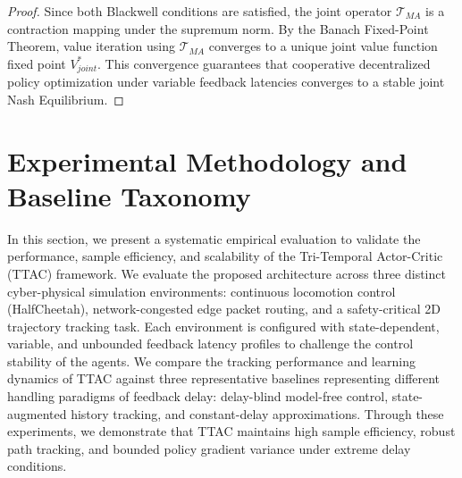 \documentclass[manuscript, screen, review]{jair}
\begin{document}
\begin{proof}
Since both Blackwell conditions are satisfied, the joint operator $\mathcal{T}_{MA}$ is a contraction mapping under the supremum norm. By the Banach Fixed-Point Theorem, value iteration using $\mathcal{T}_{MA}$ converges to a unique joint value function fixed point $V_{joint}^*$. This convergence guarantees that cooperative decentralized policy optimization under variable feedback latencies converges to a stable joint Nash Equilibrium.
\end{proof}

\section{Experimental Methodology and Baseline Taxonomy}
In this section, we present a systematic empirical evaluation to validate the performance, sample efficiency, and scalability of the Tri-Temporal Actor-Critic (TTAC) framework. We evaluate the proposed architecture across three distinct cyber-physical simulation environments: continuous locomotion control (HalfCheetah), network-congested edge packet routing, and a safety-critical 2D trajectory tracking task. Each environment is configured with state-dependent, variable, and unbounded feedback latency profiles to challenge the control stability of the agents. We compare the tracking performance and learning dynamics of TTAC against three representative baselines representing different handling paradigms of feedback delay: delay-blind model-free control, state-augmented history tracking, and constant-delay approximations. Through these experiments, we demonstrate that TTAC maintains high sample efficiency, robust path tracking, and bounded policy gradient variance under extreme delay conditions.
\end{document}
